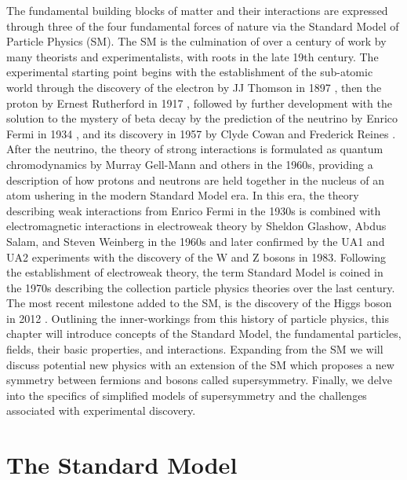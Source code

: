 The fundamental building blocks of matter and their interactions are expressed through three of the four fundamental forces of nature via the Standard Model of Particle Physics (SM). The SM  is the culmination of over a century of work by many theorists and experimentalists, with roots in the late 19th century. The experimental starting point begins with the establishment of the sub-atomic world through the discovery of the electron by JJ Thomson in 1897 \cite{Thomson:1897cm}, then the proton by Ernest Rutherford in 1917 \cite{Rutherford:1911zz}, followed by further development with the solution to the mystery of beta decay by the prediction of the neutrino by Enrico Fermi in 1934 \cite{Fermi:1934hr}, and its discovery in 1957 by Clyde Cowan and Frederick Reines \cite{Reines:1956rs}.  After the neutrino,  the theory of strong interactions is formulated as quantum chromodynamics by Murray Gell-Mann and others in the 1960s, providing a description of how protons and neutrons are held together in the nucleus of an atom \cite{GellMann:1964nj} ushering in the modern Standard Model era. In this era, the theory describing weak interactions from Enrico Fermi in the 1930s is combined with electromagnetic interactions in electroweak theory by Sheldon Glashow, Abdus Salam, and Steven Weinberg in the 1960s \cite{GLASHOW1961579}\cite{Salam:1968rm}\cite{Weinberg:1967tq} and later confirmed by the UA1 and UA2 experiments with the discovery of the W and Z bosons in 1983\cite{arnison1983experimental}\cite{glashow1984future}. Following the establishment of electroweak theory, the term Standard Model is coined in the 1970s describing the collection particle physics theories over the last century. The most recent milestone added to the SM, is the discovery of the Higgs boson in 2012 \cite{CMS:2012qbp}\cite{ATLAS:2012yve}.  Outlining the inner-workings from this history of particle physics, this chapter will introduce concepts of the Standard Model, the fundamental particles, fields, their basic properties, and interactions. Expanding from the  SM we will discuss potential new physics with an extension of the SM which proposes a new symmetry between fermions and bosons called supersymmetry. Finally, we delve into the specifics of simplified models of supersymmetry and the challenges associated with experimental discovery.



\section{The Standard Model}

